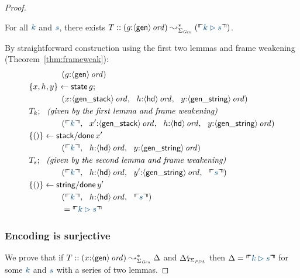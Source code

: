 \begin{proof}
\begin{lemma} For all $\obj{k}$ and $\obj{s}$, there exists
$T :: ({g{:}\istrue{\susp{\sf gen}}}) \leadsto^*_{\Sigma_{\it Gen}} 
(\ctxinterp{k \rhd s})$. 
\end{lemma}
\noindent
By straightforward construction using the first two lemmas
and frame weakening (Theorem~\ref{thm:frameweak}): 
\begin{align*}
& \qquad\qquad (g{:}\istrue{\susp{\sf gen}})\\
& \trstep{x,h,y}{{\sf state}\,g};\\
& \qquad\qquad
       (x{:}\istrue{\susp{\sf gen\_stack}},  ~~
        h{:}\istrue{\susp{\sf hd}},~~ 
        y{:}\istrue{\susp{\sf gen\_string}})\\
& T_k; ~~ \mbox{\it (given by the first lemma and frame weakening)}\\
& \qquad\qquad
       (\ctxinterp{k},  ~~
        x'{:}\istrue{\susp{\sf gen\_stack}},  ~~
        h{:}\istrue{\susp{\sf hd}}, ~~
        y{:}\istrue{\susp{\sf gen\_string}})\\
& \trstep{()}{{\sf stack/done}\,x'}\\
& \qquad\qquad
       (\ctxinterp{k},  ~~
        h{:}\istrue{\susp{\sf hd}}, ~~
        y{:}\istrue{\susp{\sf gen\_string}})\\
& T_s; ~~ \mbox{\it (given by the second lemma and frame weakening)}\\
& \qquad\qquad
       (\ctxinterp{k}, ~~
        h{:}\istrue{\susp{\sf hd}}, ~~
        y'{:}\istrue{\susp{\sf gen\_string}}, ~~
        \ctxinterp{s})\\
& \trstep{()}{{\sf string/done}\,y'}\\
& \qquad\qquad 
       (\ctxinterp{k}, ~~
        h{:}\istrue{\susp{\sf hd}}, ~~
        \ctxinterp{s}) \\
& \qquad\qquad = \ctxinterp{k \rhd s}
\end{align*}


\subsubsection{Encoding is surjective}

We prove that if $T :: (x{:}{\langle {\sf gen} \rangle}\,{{\it ord}}) \leadsto^*_{\Sigma_{\it
    Gen}} \Delta$ and ${\Delta}{\mbox{\lightning}}_{\Sigma_{\it PDA}}$ then
$\Delta = \ctxinterp{k \rhd s}$ for some $\obj{k}$ and $\obj{s}$
with a series of two lemmas.


\end{proof}
